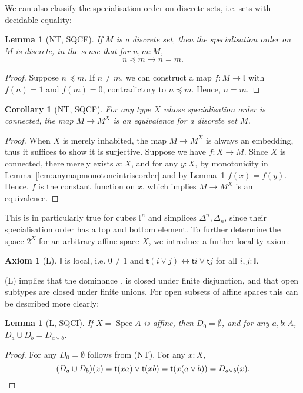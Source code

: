\documentclass[12pt]{amsart}
\newtheorem{lemma}[theorem]{Lemma}
\newtheorem{corollary}[theorem]{Corollary}
\theoremstyle{definition}
\newtheorem*{axiom}{Axiom}
\newcommand{\mbb}[1]{\mathbb{#1}}
\newcommand{\I}{\mbb I}
\newcommand{\ms}[1]{\mathsf{#1}}
\newcommand{\emp}{\emptyset}
\newcommand{\eq}{\leftrightarrow}
\newcommand{\spec}{\operatorname{Spec}}
\begin{document}
We can also classify the specialisation order on discrete sets, i.e. sets with decidable equality:

\begin{lemma}[NT, SQCF]\label{lem:discretephoa}
  If $M$ is a discrete set, then the specialisation order on $M$ is discrete, in the sense that for $n,m : M$,
  \[ n \preceq m \to n = m. \]
\end{lemma}
\begin{proof}
  Suppose $n \preceq m$. If $n \neq m$, we can construct a map $f : M \to \I$ with $f(n) = 1$ and $f(m) = 0$, contradictory to $n \preceq m$. Hence, $n = m$.
\end{proof}

\begin{corollary}[NT, SQCF]\label{cor:connectedpreservediscrete}
  For any type $X$ whose specialisation order is connected, the map $M \to M^X$ is an equivalence for a discrete set $M$.
\end{corollary}
\begin{proof}
  When $X$ is merely inhabited, the map $M \to M^X$ is always an embedding, thus it suffices to show it is surjective. Suppose we have $f : X \to M$. Since $X$ is connected, there merely exists $x:X$, and for any $y:X$, by monotonicity in Lemma~\ref{lem:anymapmonotoneintriscorder} and by Lemma~\ref{lem:discretephoa} $f(x) = f(y)$. Hence, $f$ is the constant function on $x$, which implies $M \to M^X$ is an equivalence.
\end{proof}

This is in particularly true for cubes $\I^n$ and simplices $\Delta^n,\Delta_n$, since their specialisation order has a top and bottom element. To further determine the space $2^X$ for an arbitrary affine space $X$, we introduce a further locality axiom:

\begin{axiom}[L]
  $\I$ is local, i.e. $0 \neq 1$ and $\ms t(i\vee j) \eq \ms ti \vee \ms tj$ for all $i,j : \I$.
\end{axiom}

(L) implies that the dominance $\I$ is closed under finite disjunction, and that open subtypes are closed under finite unions. For open subsets of affine spaces this can be described more clearly:

\begin{lemma}[L, SQCI]
  If $X = \spec A$ is affine, then $D_0 = \emp$, and for any $a,b : A$, $D_a \cup D_b = D_{a\vee b}$.
\end{lemma}
\begin{proof}
  For any $D_0 = \emp$ follows from (NT). For any $x:X$,
  \[ (D_a \cup D_b) (x) = \ms t(xa) \vee \ms t(xb) = \ms t(x(a \vee b)) = D_{a\vee b}(x). \qedhere \]
\end{proof}
\end{document}
